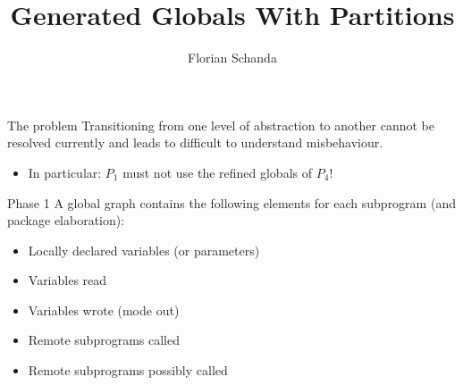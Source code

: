 \documentclass{beamer}
\title{Generated Globals With Partitions}
\author{Florian Schanda}
\begin{document}
\maketitle

\begin{frame}{The problem}
  Transitioning from one level of abstraction to another cannot be resolved
  currently and leads to difficult to understand misbehaviour.

  \begin{center}
  \end{center}

  \begin{itemize}
  \item<2->In particular: $P_1$ must not use the refined globals of $P_4$!
  \end{itemize}

\end{frame}

\begin{frame}{Phase 1}
  A global graph contains the following elements for each subprogram (and
  package elaboration):
  \begin{itemize}
  \item Locally declared variables (or parameters)
  \item Variables read
  \item Variables wrote (mode out)
  \item Remote subprograms called
  \item Remote subprograms possibly called
  \end{itemize}
\end{frame}
\end{document}

